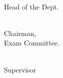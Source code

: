 \documentclass{standalone}
\begin{document}
\begin{titlepage}
    \vspace{4.0cm}
				
\begin{multicols}{3}	
	\begin{flushleft}
		\hrulefill \\
        \centering
		Head of the Dept.
	\end{flushleft}
	
    \begin{flushleft}
		\hrulefill \\
        \centering
		Chairman,\\ 
        Exam Committee.
	\end{flushleft}				
	
    \begin{flushleft}
		\hrulefill \\
        \centering
		Supervisor
	\end{flushleft}    
\end{multicols}
    

\end{titlepage}
\end{document}
